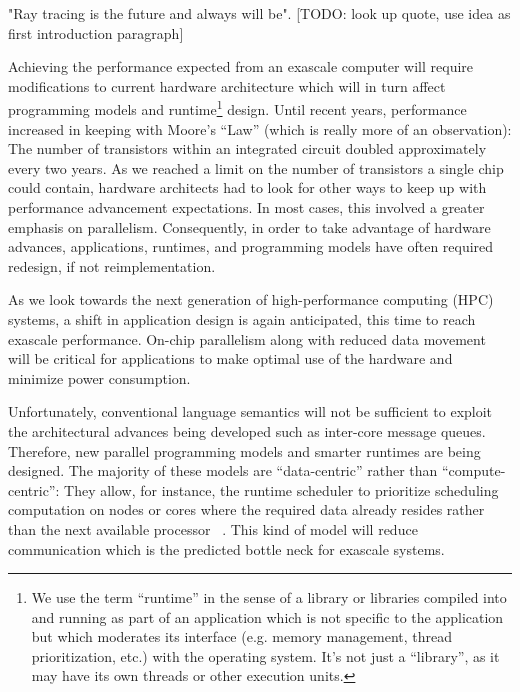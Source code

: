 \label{sec:introduction}
  
"Ray tracing is the future and always will be". [TODO: look up quote, use idea 
as first introduction paragraph]
  
Achieving the performance expected from an exascale computer will
require modifications to current hardware architecture which will in
turn affect programming models and runtime\footnote{ %
  We use the term ``runtime'' in the sense of a library or libraries
  compiled into and running as part of an application which is not
  specific to the application but which moderates its interface (e.g.
  memory management, thread prioritization, etc.) with the operating
  system. It's not just a ``library'', as it may have its own threads
  or other execution units. %
} design. Until recent years, performance increased in keeping with
Moore's ``Law'' (which is really more of an observation): The number
of transistors within an integrated circuit doubled approximately
every two years. As we reached a limit on the number of transistors a
single chip could contain, hardware architects had to look for other
ways to keep up with performance advancement expectations. In most
cases, this involved a greater emphasis on parallelism. Consequently,
in order to take advantage of hardware advances, applications,
runtimes, and programming models have often required redesign, if not
reimplementation.

As we look towards the next generation of high-performance computing
(HPC) systems, a shift in application design is again anticipated,
this time to reach exascale performance. On-chip parallelism along
with reduced data movement will be critical for applications to make
optimal use of the hardware and minimize power consumption.

Unfortunately, conventional language semantics will not be sufficient
to exploit the architectural advances being developed such as
inter-core message queues. Therefore, new parallel programming models
and smarter runtimes are being designed. The majority of these models
are ``data-centric'' rather than ``compute-centric'': They allow, for
instance, the runtime scheduler to prioritize scheduling computation
on nodes or cores where the required data already resides rather than
the next available processor ~\cite{kogge2013exascale}. This kind of
model will reduce communication which is the predicted bottle neck for
exascale systems.

